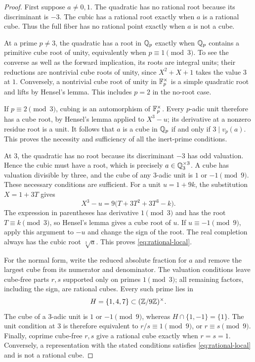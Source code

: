 \begin{proof}
First suppose \(a\ne0,1\).  The quadratic has no rational root because
its discriminant is \(-3\).  The cubic has a rational root exactly when
\(a\) is a rational cube.  Thus the full fiber has no rational point
exactly when \(a\) is not a cube.

At a prime \(p\ne3\), the quadratic has a root in \(\mathbb Q_p\) exactly when
\(\mathbb Q_p\) contains a primitive cube root of unity, equivalently when
\(p\equiv1\pmod3\).  To see the converse as well as the forward
implication, its roots are integral units; their reductions are
nontrivial cube roots of unity, since \(X^2+X+1\) takes the value \(3\)
at \(1\).  Conversely, a nontrivial cube root of unity in
\(\mathbb F_p^\times\) is a simple quadratic root and lifts by Hensel's lemma.
This includes \(p=2\) in the no-root case.

If \(p\equiv2\pmod3\), cubing is an automorphism of
\(\mathbb F_p^\times\).  Every \(p\)-adic unit therefore has a cube root, by
Hensel's lemma applied to \(X^3-u\); its derivative at a nonzero
residue root is a unit.  It follows that \(a\) is a cube in \(\mathbb Q_p\)
if and only if \(3\mid v_p(a)\).  This proves the necessity and
sufficiency of all the inert-prime conditions.

At \(3\), the quadratic has no root because its discriminant \(-3\)
has odd valuation.  Hence the cubic must have a root, which is precisely
\(a\in\mathbb Q_3^{\times3}\).  A cube has valuation divisible by three, and
the cube of any \(3\)-adic unit is \(1\) or \(-1\pmod9\).
These necessary conditions are sufficient.  For a unit \(u=1+9k\),
the substitution \(X=1+3T\) gives
\[
 X^3-u=9\bigl(T+3T^2+3T^3-k\bigr).
\]
The expression in parentheses has derivative \(1\pmod3\) and has
the root \(T\equiv k\pmod3\), so Hensel's lemma gives a cube root
of \(u\).  If \(u\equiv-1\pmod9\), apply this argument to \(-u\)
and change the sign of the root.  The real completion always has the
cubic root \(\sqrt[3]{a}\).  This proves \eqref{eq:rational-local}.

For the normal form, write the reduced absolute fraction for \(a\) and
remove the largest cube from its numerator and denominator.  The
valuation conditions leave cube-free parts \(r,s\) supported only on
primes \(1\pmod3\); all remaining factors, including the sign, are
rational cubes.  Every such prime lies in
\[
 H=\{1,4,7\}\subset(\mathbb Z/9\mathbb Z)^\times.
\]
The cube of a \(3\)-adic unit is \(1\) or \(-1\pmod9\), whereas
\(H\cap\{1,-1\}=\{1\}\).  The unit condition at \(3\) is therefore
equivalent to \(r/s\equiv1\pmod9\), or \(r\equiv s\pmod9\).
Finally, coprime cube-free \(r,s\) give a rational cube exactly when
\(r=s=1\).  Conversely, a representation with the stated conditions
satisfies \eqref{eq:rational-local} and is not a rational cube.


\end{proof}
